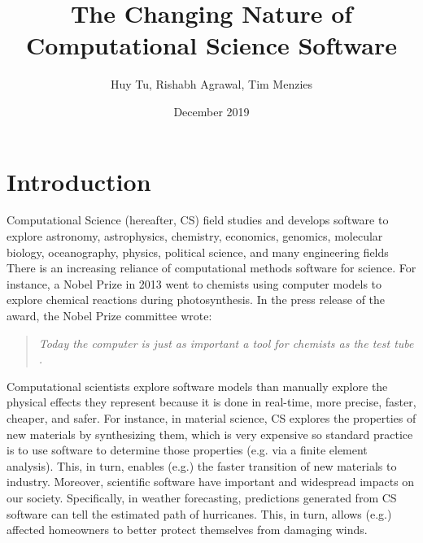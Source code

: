 \documentclass[sigconf]{acmart}
\title[Changing  Nature of CS Software]{The Changing Nature of Computational Science Software}
\author{Huy Tu, Rishabh Agrawal, Tim Menzies}
\affiliation{ Computer Science, NC State, USA} \email{hqtu@ncsu.edu,  ragrawa3@ncsu.edu, timm@ieee.org}
\date{December 2019}
\begin{document}
\maketitle

\section{Introduction}
  

Computational Science (hereafter, CS)
field studies and develops software   to explore
 astronomy, astrophysics, chemistry, economics, genomics, molecular biology, oceanography, physics, political science,  and many   engineering fields 
There is an increasing reliance of computational methods software for science. For instance, a Nobel Prize in 2013 went to chemists using computer models to explore chemical reactions during photosynthesis. In the press release of the award, the Nobel Prize committee wrote:

\begin{quote}
{\em Today the computer is just as important a tool for chemists as the test tube \cite{nobel_2013}.}
\end{quote}


Computational scientists explore software models than manually explore the physical effects they represent because it is done in real-time, more precise, faster, cheaper, and safer.  For instance, in material science, CS explores the properties
of new materials by synthesizing them, which is very expensive so standard practice is to use software to determine
those properties (e.g. via a finite element analysis). This, in turn, enables (e.g.) the faster transition of new materials to industry. Moreover, scientific software have important and widespread impacts on our society. Specifically, in weather forecasting, predictions generated from CS
software can tell the estimated path of hurricanes. This, in turn,
allows (e.g.) affected homeowners to better protect themselves from
damaging winds. 

\end{document}
